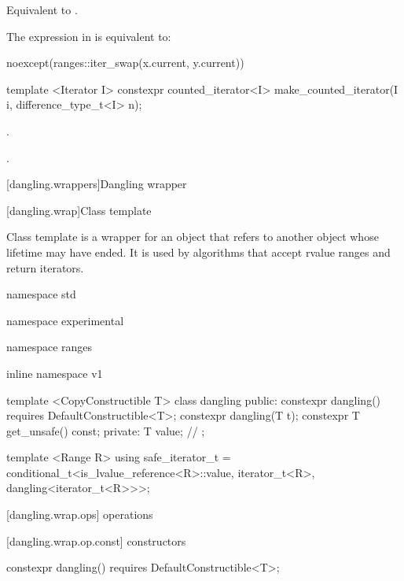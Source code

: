 \begin{itemdescr}
\pnum
\effects Equivalent to .

\pnum
\remarks The expression in  is equivalent to:
\begin{codeblock}
noexcept(ranges::iter_swap(x.current, y.current))
\end{codeblock}
\end{itemdescr}

%
\begin{itemdecl}
template <Iterator I>
  constexpr counted_iterator<I> make_counted_iterator(I i, difference_type_t<I> n);
\end{itemdecl}

\begin{itemdescr}
\pnum
\requires {}.

\pnum
\returns {}.
\end{itemdescr}

[dangling.wrappers]{Dangling wrapper}

[dangling.wrap]{Class template }

\pnum
{}%
Class template  is a wrapper for an object that refers to another object whose
lifetime may have ended. It is used by algorithms that accept rvalue ranges and return iterators.

\begin{codeblock}
namespace std { namespace experimental { namespace ranges { inline namespace v1 {
  template <CopyConstructible T>
  class dangling {
  public:
    constexpr dangling() requires DefaultConstructible<T>;
    constexpr dangling(T t);
    constexpr T get_unsafe() const;
  private:
    T value; // \expos
  };

  template <Range R>
  using safe_iterator_t =
    conditional_t<is_lvalue_reference<R>::value,
      iterator_t<R>,
      dangling<iterator_t<R>>>;
}}}}
\end{codeblock}

[dangling.wrap.ops]{ operations}

[dangling.wrap.op.const]{ constructors}

%
\begin{itemdecl}
constexpr dangling() requires DefaultConstructible<T>;
\end{itemdecl}

